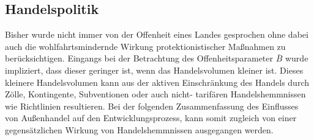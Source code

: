 \subsection{Handelspolitik}
Bisher wurde nicht immer von der Offenheit eines Landes gesprochen ohne dabei auch die wohlfahrtsmindernde Wirkung protektionistischer Ma{\ss}nahmen zu berücksichtigen. Eingangs bei der Betrachtung des Offenheitsparameter $\bar{B}$ wurde impliziert, dass dieser geringer ist, wenn das Handelsvolumen kleiner ist. Dieses kleinere Handelsvolumen kann aus der aktiven Einschränkung des Handels durch Zölle, Kontingente, Subventionen oder auch nicht- tarifären Handelshemmnissen wie Richtlinien resultieren. Bei der folgenden Zusammenfassung des Einflusses von Au{\ss}enhandel auf den Entwicklungsprozess, kann somit zugleich von einer gegensätzlichen Wirkung von Handelshemmnissen ausgegangen werden. 

